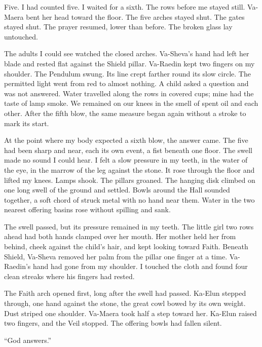 Five. I had counted five. I waited for a sixth. The rows before me stayed still. Va-Maera bent her head toward the floor. The five arches stayed shut. The gates stayed shut. The prayer resumed, lower than before. The broken glass lay untouched.\par

The adults I could see watched the closed arches. Va-Sheva's hand had left her blade and rested flat against the Shield pillar. Va-Raedin kept two fingers on my shoulder. The Pendulum swung. Its line crept farther round its slow circle. The permitted light went from red to almost nothing. A child asked a question and was not answered. Water travelled along the rows in covered cups; mine had the taste of lamp smoke. We remained on our knees in the smell of spent oil and each other. After the fifth blow, the same measure began again without a stroke to mark its start.\par

At the point where my body expected a sixth blow, the answer came. The five had been sharp and near, each its own event, a fist beneath one floor. The swell made no sound I could hear. I felt a slow pressure in my teeth, in the water of the eye, in the marrow of the leg against the stone. It rose through the floor and lifted my knees. Lamps shook. The pillars groaned. The hanging disk climbed on one long swell of the ground and settled. Bowls around the Hall sounded together, a soft chord of struck metal with no hand near them. Water in the two nearest offering basins rose without spilling and sank.\par

The swell passed, but its pressure remained in my teeth. The little girl two rows ahead had both hands clamped over her mouth. Her mother held her from behind, cheek against the child's hair, and kept looking toward Faith. Beneath Shield, Va-Sheva removed her palm from the pillar one finger at a time. Va-Raedin's hand had gone from my shoulder. I touched the cloth and found four clean streaks where his fingers had rested.\par

The Faith arch opened first, long after the swell had passed. Ka-Elun stepped through, one hand against the stone, the great cowl bowed by its own weight. Dust striped one shoulder. Va-Maera took half a step toward her. Ka-Elun raised two fingers, and the Veil stopped. The offering bowls had fallen silent.\par

``God answers.''\par


